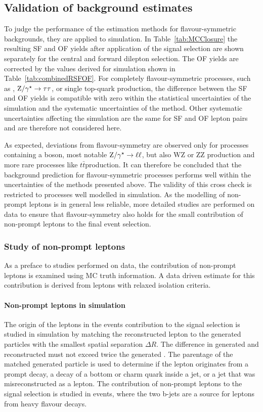 \subsection{Validation of background estimates}
\label{sec:validation}
To judge the performance of the estimation methods for flavour-symmetric backgrounds, they are applied to simulation. In Table~\ref{tab:MCClosure} the resulting SF and OF yields after application of the signal selection are shown separately for the central and forward dilepton selection. The OF yields are corrected by the \Rsfof values derived for simulation shown in Table~\ref{tab:combinedRSFOF}. For completely flavour-symmetric processes, such as \ttbar, $\mathrm{Z}/\gamma^{\star}\rightarrow \tau\tau$, or single top-quark production, the difference between the SF and OF yields is compatible with zero within the statistical uncertainties of the simulation and the systematic uncertainties of the method. Other systematic uncertainties affecting the simulation are the same for SF and OF lepton pairs and are therefore not considered here. 

 As expected, deviations from flavour-symmetry are observed only for processes containing a \Z boson, most notable $\mathrm{Z}/\gamma^{\star}\rightarrow \ell\ell$, but also $\mathrm{WZ}$ or $\mathrm{ZZ}$ production and more rare processes like $t\bar{t}$\Z production. It can therefore be concluded that the background prediction for flavour-symmetric processes performs well within the uncertainties of the methods presented above. The validity of this cross check is restricted to processes well modelled in simulation. As the modelling of non-prompt leptons is in general less reliable, more detailed studies are performed on data to ensure that flavour-symmetry also holds for the small contribution of non-prompt leptons to the final event selection.
\subsubsection*{Study of non-prompt leptons}
As a preface to studies performed on data, the contribution of non-prompt leptons is examined using MC truth information. A data driven estimate for this contribution is derived from leptons with relaxed isolation criteria.
\paragraph*{Non-prompt leptons in simulation}
The origin of the leptons in the events contribution to the signal selection is studied in simulation by matching the reconstructed lepton to the generated particles with the smallest spatial separation $\Delta R$. The difference in generated and reconstructed \pt must not exceed twice the generated \pt. The parentage of the matched generated particle is used to determine if the lepton originates from a prompt decay, a decay of a bottom or charm quark inside a jet, or a jet that was misreconstructed as a lepton. The contribution of non-prompt leptons to the signal selection is studied in \ttbar events, where the two b-jets are a source for leptons from heavy flavour decays. 

